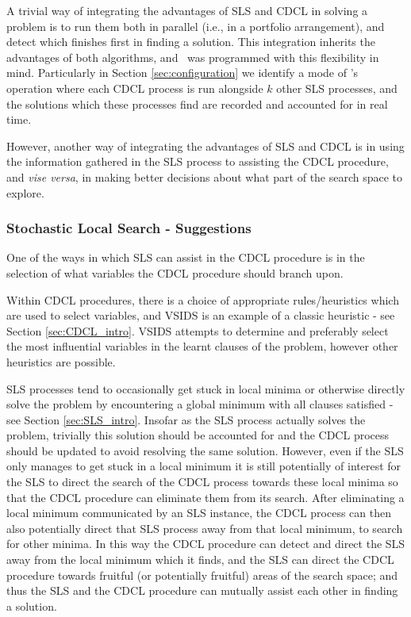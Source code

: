 \documentclass[
10pt, %
a4paper, %
oneside, %
headinclude,footinclude, %
BCOR5mm, %
]{scrartcl}
\begin{document}
A trivial way of integrating the advantages of SLS and CDCL in solving a problem is to run them both in parallel (i.e., in a portfolio arrangement), and detect which finishes first in finding a solution.
This integration inherits the advantages of both algorithms, and \dagster\  was programmed with this flexibility in mind.
Particularly in Section \ref{sec:configuration} we identify a mode of \dagster's operation where each CDCL process is run alongside $k$ other SLS processes, and the solutions which these processes find are recorded and accounted for in real time.

However, another way of integrating the advantages of SLS and CDCL is in using the information gathered in the SLS process to assisting the CDCL procedure, and {\em vise versa}, in making better decisions about what part of the search space to explore.

\subsubsection{Stochastic Local Search - Suggestions}\label{sec:SLS_suggestions}
One of the ways in which SLS can assist in the CDCL procedure is in the selection of what variables the CDCL procedure should branch upon.

Within CDCL procedures, there is a choice of appropriate rules/heuristics which are used to select variables, and VSIDS is an example of a classic heuristic
 - see Section \ref{sec:CDCL_intro}.
VSIDS attempts to determine and preferably select the most influential variables in the learnt clauses of the problem, however other heuristics are possible.

SLS processes tend to occasionally get stuck in local minima or otherwise directly solve the problem by encountering a global minimum with all clauses satisfied - see Section \ref{sec:SLS_intro}.
Insofar as the SLS process actually solves the problem, trivially this solution should be accounted for and the CDCL process should be updated to avoid resolving the same solution.
However, even if the SLS only manages to get stuck in a local minimum it is still potentially of interest for the SLS to direct the search of the CDCL process towards these local minima so that the CDCL procedure can eliminate them from its search.
After eliminating a local minimum communicated by an SLS instance, the CDCL process can then also potentially direct that SLS process away from that local minimum, to search for other minima.
In this way the CDCL procedure can detect and direct the SLS away from the local minimum which it finds, and the SLS can direct the CDCL procedure towards fruitful (or potentially fruitful) areas of the search space; and thus the SLS and the CDCL procedure can mutually assist each other in finding a solution.
\end{document}

